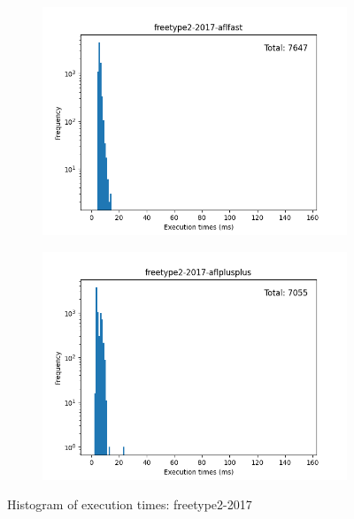 \begin{figure}
\begin{subfigure}[t]{0.475\textwidth}
        \centering
        \includegraphics[width=\textwidth]{Experiments/execs/freetype2-2017-aflfast.png}
        \caption{}
        \label{fig:sub:freetype-hist-aflfast}
    \end{subfigure}
    \hfill
    \begin{subfigure}[t]{0.475\textwidth}
        \centering
        \includegraphics[width=\textwidth]{Experiments/execs/freetype2-2017-aflplusplus.png}
        \caption{}
        \label{fig:sub:freetype-hist-aflplusplus}
    \end{subfigure}

    \caption{Histogram of execution times: freetype2-2017}
    \label{Figure:exe-freetype}
\end{figure}


